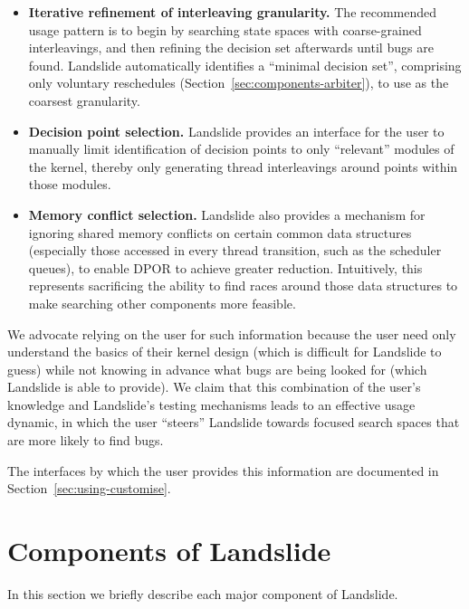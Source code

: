 {\begin{itemize}
	\item {\bf Iterative refinement of interleaving granularity.} The recommended usage pattern is to begin by searching state spaces with coarse-grained interleavings, and then refining the decision set afterwards until bugs are found. Landslide automatically identifies a ``minimal decision set'', comprising only voluntary reschedules (Section~\ref{sec:components-arbiter}), to use as the coarsest granularity.
	\item {\bf Decision point selection.} Landslide provides an interface for the user to manually limit identification of decision points to only ``relevant'' modules of the kernel, thereby only generating thread interleavings around points within those modules.
	\item {\bf Memory conflict selection.} Landslide also provides a mechanism for ignoring shared memory conflicts on certain common data structures (especially those accessed in every thread transition, such as the scheduler queues), to enable DPOR to achieve greater reduction. Intuitively, this represents sacrificing the ability to find races around those data structures to make searching other components more feasible.
\end{itemize}

We advocate relying on the user for such information because the user need only understand the basics of their kernel design (which is difficult for Landslide to guess) while not knowing in advance what bugs are being looked for (which Landslide is able to provide). We claim that this combination of the user's knowledge and Landslide's testing mechanisms leads to an effective usage dynamic, in which the user ``steers'' Landslide towards focused search spaces that are more likely to find bugs.

The interfaces by which the user provides this information are documented in Section~\ref{sec:using-customise}.
}

\section{Components of Landslide}
\label{sec:components}

In this section we briefly describe each major component of Landslide.

